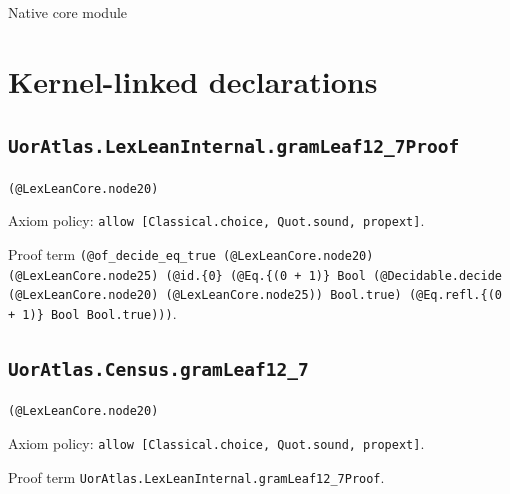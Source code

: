 \documentclass[11pt]{article}
\begin{document}
\begin{center}{\LARGE Native core module}\end{center}
\section*{Kernel-linked declarations}
\subsection*{\texttt{UorAtlas.LexLeanInternal.gramLeaf12\_7Proof}}
\noindent\texttt{(@LexLeanCore.node20)}\par
\noindent Axiom policy: \texttt{allow [Classical.choice, Quot.sound, propext]}.\par
\noindent Proof term \texttt{(@of\_decide\_eq\_true (@LexLeanCore.node20) (@LexLeanCore.node25) (@id.\{0\} (@Eq.\{(0 + 1)\} Bool (@Decidable.decide (@LexLeanCore.node20) (@LexLeanCore.node25)) Bool.true) (@Eq.refl.\{(0 + 1)\} Bool Bool.true)))}.\par
\subsection*{\texttt{UorAtlas.Census.gramLeaf12\_7}}
\noindent\texttt{(@LexLeanCore.node20)}\par
\noindent Axiom policy: \texttt{allow [Classical.choice, Quot.sound, propext]}.\par
\noindent Proof term \texttt{UorAtlas.LexLeanInternal.gramLeaf12\_7Proof}.\par
\end{document}
